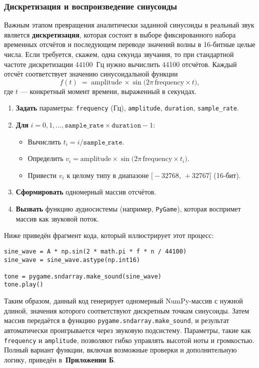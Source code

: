 \documentclass[bachelor, och, diploma]{SCWorks}
\begin{document}
\subsubsection{Дискретизация и воспроизведение синусоиды}

Важным этапом превращения аналитически заданной синусоиды в реальный звук является \textbf{дискретизация}, которая состоит в выборе фиксированного набора временных отсчётов и последующем переводе значений волны в 16-битные целые числа. Если требуется, скажем, одна секунда звучания, то при стандартной частоте дискретизации $44100$~Гц нужно вычислить 44100 отсчётов. Каждый отсчёт соответствует значению синусоидальной функции 
\[
   f(t) \;=\; \text{amplitude}\,\times \sin\bigl(2\pi \,\text{frequency}\times t\bigr),
\]
где $t$ --- конкретный момент времени, выраженный в секундах.

\begin{enumerate}
\item \textbf{Задать} параметры: \texttt{frequency} (Гц), \texttt{amplitude}, \texttt{duration}, \texttt{sample\_rate}.
\item \textbf{Для} $i=0,1,\dots,\texttt{sample\_rate}\times\texttt{duration}-1$:
  \begin{itemize}
    \item Вычислить $t_i = i / \texttt{sample\_rate}$.
    \item Определить $v_i = \text{amplitude} \times \sin\bigl(2\pi\,\text{frequency}\times t_i\bigr)$.
    \item Привести $v_i$ к целому типу в диапазоне $\bigl[-32768,\,+32767\bigr]$ (16-бит).
  \end{itemize}
\item \textbf{Сформировать} одномерный массив отсчётов.
\item \textbf{Вызвать} функцию аудиосистемы (например, \texttt{PyGame}), которая воспримет массив как звуковой поток.
\end{enumerate}

\noindent
Ниже приведён фрагмент кода, который иллюстрирует этот процесс:

\begin{verbatim}
sine_wave = A * np.sin(2 * math.pi * f * n / 44100)
sine_wave = sine_wave.astype(np.int16)

tone = pygame.sndarray.make_sound(sine_wave)
tone.play()
\end{verbatim}

Таким образом, данный код генерирует одномерный NumPy-массив с нужной длиной, значения которого соответствуют дискретным точкам синусоиды. Затем массив передаётся в функцию \texttt{pygame.sndarray.make\_sound}, и результат автоматически проигрывается через звуковую подсистему. Параметры, такие как \texttt{frequency} и \texttt{amplitude}, позволяют гибко управлять высотой ноты и громкостью. Полный вариант функции, включая возможные проверки и дополнительную логику, приведён в~\textbf{Приложении Б}.
\end{document}
